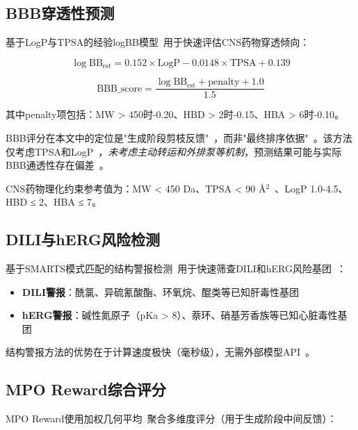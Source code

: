 \subsection{BBB穿透性预测}

基于LogP与TPSA的经验logBB模型~\cite{Clark2000}用于快速评估CNS药物穿透倾向：

\begin{equation}
\log\text{BB}_{\text{est}} = 0.152 \times \text{LogP} - 0.0148 \times \text{TPSA} + 0.139
\end{equation}

\begin{equation}
\text{BBB\_score} = \frac{\log\text{BB}_{\text{est}} + \text{penalty} + 1.0}{1.5}
\end{equation}

其中penalty项包括：MW > 450时-0.20、HBD > 2时-0.15、HBA > 6时-0.10。

BBB评分在本文中的定位是"生成阶段剪枝反馈"~\cite{Clark2000}，而非"最终排序依据"~\cite{Daina2017}。该方法仅考虑TPSA和LogP~\cite{Clark2000}，\textit{未考虑主动转运和外排泵等机制}，预测结果可能与实际BBB通透性存在偏差~\cite{Pardridge2012}。

CNS药物理化约束参考值为：MW < 450 Da、TPSA < 90 \AA$^2$~\cite{Ertl2000}、LogP 1.0-4.5、HBD ≤ 2、HBA ≤ 7。

\subsection{DILI与hERG风险检测}

基于SMARTS模式匹配的结构警报检测~\cite{Aronov2008}用于快速筛查DILI和hERG风险基团~\cite{Aronov2008}：

\begin{itemize}
    \item \textbf{DILI警报}：酰氯、异硫氰酸酯、环氧烷、醌类等已知肝毒性基团~\cite{Aronov2008}
    \item \textbf{hERG警报}：碱性氮原子（pKa > 8）、萘环、硝基芳香族等已知心脏毒性基团~\cite{Aronov2008}
\end{itemize}

结构警报方法的优势在于计算速度极快（毫秒级），无需外部模型API~\cite{Aronov2008}。

\subsection{MPO Reward综合评分}

MPO Reward使用加权几何平均~\cite{Zhou2019Exp}聚合多维度评分（用于生成阶段中间反馈）：


